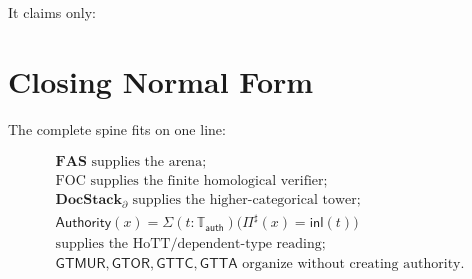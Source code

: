 \documentclass[11pt]{article}
\begin{document}
It claims only:

\begin{center}
\end{center}

\section{Closing Normal Form}

The complete spine fits on one line:

\[
\boxed{
\begin{gathered}
\mathbf{FAS}\text{ supplies the arena;}\\
\operatorname{FOC}\text{ supplies the finite homological verifier;}\\
\mathbf{DocStack}_{\partial}\text{ supplies the higher-categorical tower;}\\
\mathsf{Authority}(x)=\Sigma(t:\mathbb T_{\mathsf{auth}})\bigl(\Pi^\sharp(x)=\mathsf{inl}(t)\bigr)\\
\text{supplies the HoTT/dependent-type reading;}\\
\mathsf{GTMUR},\mathsf{GTOR},\mathsf{GTTC},\mathsf{GTTA}
\text{ organize without creating authority.}
\end{gathered}
}
\]

\begin{center}
\end{center}
\end{document}
